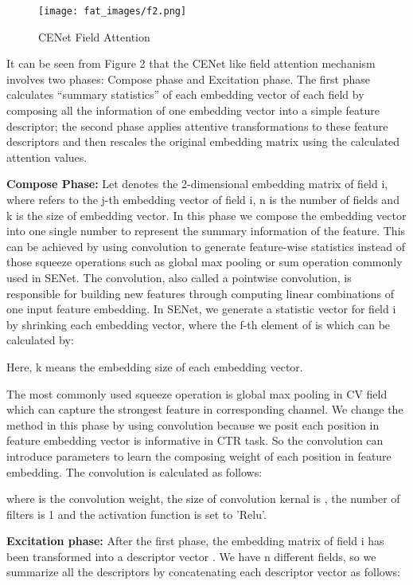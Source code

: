 \documentclass{article}
\begin{document}
\begin{figure}[hbt!]
\texttt{[image: fat\_images/f2.png]}
\caption{CENet Field Attention}
\label{fig:f2}
\end{figure}


It can be seen from Figure 2 that the CENet like field attention mechanism involves two phases: Compose phase and Excitation phase. The first phase calculates ``summary statistics'' of each embedding vector of each field by composing all the information of one embedding vector into a simple feature descriptor; the second phase applies attentive transformations to these feature descriptors and then rescales the original embedding matrix using the calculated attention values. 

\noindent\textbf{Compose  Phase:}
Let  denotes the 2-dimensional  embedding matrix of field i, where  refers to the j-th embedding vector of field i, n is the number of fields and k is the size of embedding vector. In this phase we compose the embedding vector  into one single number to represent the summary information of the feature.  This can be achieved by using  convolution\cite{szegedy2016rethinking,chollet2017xception} to generate feature-wise statistics instead of those squeeze operations such as global max pooling or sum operation commonly used in SENet. The  convolution, also called a pointwise convolution, is responsible for building new features through computing linear combinations of one input feature embedding. In SENet, we generate a statistic vector  for field i by shrinking each embedding vector, where the f-th element of  is  which can be calculated by:




Here, k means the embedding size of each embedding vector.

The most commonly used squeeze operation is global max pooling in CV field which can capture the strongest feature in corresponding channel. We change the method in this phase by using  convolution because we posit each position in feature embedding vector is informative in CTR task. So the  convolution can introduce parameters to learn the composing weight of each position in feature embedding. The  convolution is calculated as follows:

where  is the convolution weight, the size of convolution kernal is , the number of filters is 1 and the activation function is set to 'Relu'.

\noindent\textbf{Excitation phase:}
After the first phase, the embedding matrix of field i  has been transformed into a descriptor vector  . We have n different fields, so we summarize all the descriptors by concatenating each descriptor vector as follows:
            
\end{document}

